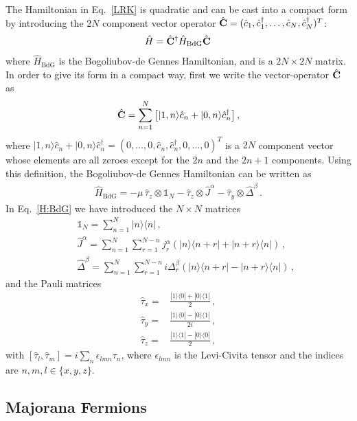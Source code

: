 \documentclass[pra,twocolumn,
superscriptaddress,
showpacs,
aps
]{revtex4-1}
\begin{document}
The Hamiltonian in Eq.~\eqref{LRK} is quadratic and can be cast into a compact form by introducing the  $2N$ component vector operator  $\hat{\bf C}=(\hat c_1,\hat c_1^\dagger,\ldots,\hat c_N, \hat c_N^\dagger)^T$: 
\begin{align}
\label{H:C}
\hat{H}=\hat{\bf C}^{\dag}\hat{H}_{\mathrm{BdG}}\hat{\bf C}\,
\end{align}
where $\hat H_{\mathrm{BdG}}$ is the  Bogoliubov-de Gennes Hamiltonian, and is a $2N\times 2N$ matrix. In order to give its form in a compact way, first we write the vector-operator $\hat{\bf C}$ as
\begin{align}
\label{C:n}
\hat{\bf C}=\sum_{n=1}^N\left[|1,n\rangle\hat{c}_n+|0,n\rangle\hat{c}_n^{\dag}\right],
\end{align}
where ${|1,n\rangle\hat{c}_n+|0,n\rangle\hat{c}_n^{\dag}=(0,\ldots,0,\hat c_n,\hat c_n^\dagger,0,\ldots,0)^T}$ is a $2N$ component vector whose elements are all zeroes except for the $2n$ and the $2n+1$ components. Using this definition, the Bogoliubov-de Gennes Hamiltonian can be written as
\begin{align}
\label{H:BdG}
\hat{H}_{\mathrm{BdG}}=-\mu\,\hat{\tau}_z\otimes \mathbb{1}_N-\hat{\tau}_z\otimes \hat{J}^{\alpha}-\hat{\tau}_y\otimes \hat{\Delta}^{\beta}\,.
\end{align}
In Eq.~\eqref{H:BdG} we have introduced the $N\times N$ matrices
\begin{eqnarray}
&&\mathbb{1}_N=\sum_{n=1}^N|n\rangle\langle n|\,,\\
&&\hat{J}^\alpha=\sum_{n=1}^{N} \sum_{r=1}^{N-n}j^{\alpha}_r\left(|n\rangle\langle n+r|+|n+r\rangle\langle n|\right)\,,\label{J}\\
&&\hat{\Delta}^\beta=\sum_{n=1}^{N} \sum_{r=1}^{N-n}i\Delta^{\beta}_r\left(|n\rangle\langle n+r|-|n+r\rangle\langle n|\right)\label{D}\,,
\end{eqnarray}
and the Pauli matrices
\begin{align*}
\hat{\tau}_x=&\frac{|1\rangle\langle 0|+|0\rangle\langle 1|}{2}\,,\\
\hat{\tau}_y=&\frac{|1\rangle\langle 0|-|0\rangle\langle 1|}{2i}\,,\\
\hat{\tau}_z=&\frac{|1\rangle\langle 1|-|0\rangle\langle 0|}{2}\,,
\end{align*}
with $[\hat{\tau}_l,\hat{\tau}_m]=i\sum_{n}\epsilon_{lmn}\tau_n$, where $\epsilon_{lmn}$ is the Levi-Civita tensor and the indices are $n,m,l\in\{x,y,z\}$.

\subsection{Majorana Fermions}
\end{document}
